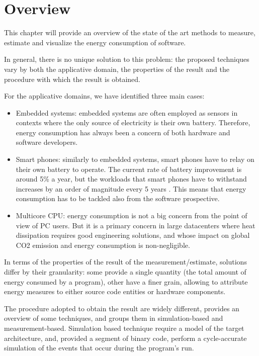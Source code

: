 \section{Overview}

This chapter will provide an overview of the state of the art methods to measure, estimate and visualize the energy consumption of software. \par
In general, there is no unique solution to this problem: the proposed techniques vary by both the applicative domain, the properties of the result and the procedure with which the result is obtained. \par
For the applicative domains, we have identified three main cases:
\begin{itemize}
\item Embedded systems: embedded systems are often employed as sensors in contexts where the only source of electricity is their own battery. Therefore, energy consumption has always been a concern of both hardware and software developers.
\item Smart phones: similarly to embedded systems, smart phones have to relay on their own battery to operate. The current rate of battery improvement is around 5\% a year, but the workloads that smart phones have to withstand increases by an order of magnitude every 5 years \cite{nunez}. This means that energy consumption has to be tackled also from the software prospective.
\item Multicore CPU: energy consumption is not a big concern from the point of view of PC users. But it is a primary concern in large datacenters where heat dissipation requires good engineering solutions, and whose impact on global CO2 emission and energy consumption is non-negligible.
\end{itemize}
\par In terms of the properties of the result of the measurement/estimate, solutions differ by their granularity: some provide a single quantity (the total amount of energy consumed by a program), other have a finer grain, allowing to attribute energy measures to either source code entities or hardware components. 
\par The procedure adopted to obtain the result are widely different, \cite{rieger} provides an overview of some techniques, and groups them in simulation-based and measurement-based. Simulation based technique require a model of the target architecture, and, provided a segment of binary code, perform a cycle-accurate simulation of the events that occur during the program's run. \newline
